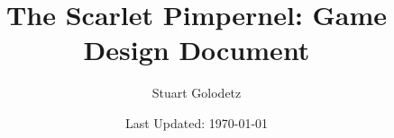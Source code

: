 \documentclass[a4paper,12pt]{report}
\begin{document}
\title{The Scarlet Pimpernel: Game Design Document}
\author{Stuart Golodetz}
\date{Last Updated: \today}
\maketitle

\tableofcontents

\dropchapter{-2cm}

\pagestyle{plain}

\addtolength{\footskip}{7mm}









\end{document}
